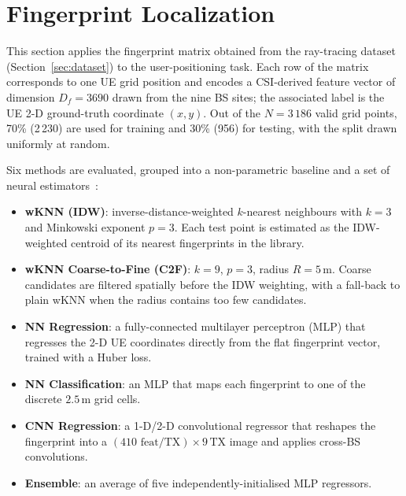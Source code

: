 \section{Fingerprint Localization}
\label{sec:localization}

This section applies the fingerprint matrix obtained from the ray-tracing
dataset (Section~\ref{sec:dataset}) to the user-positioning task.
Each row of the matrix corresponds to one UE grid position and encodes a
CSI-derived feature vector of dimension $D_f = 3690$ drawn from the nine
BS sites; the associated label is the UE 2-D ground-truth coordinate
$(x,y)$.
Out of the $N=3\,186$ valid grid points, 70\% (2\,230) are used for
training and 30\% (956) for testing, with the split drawn uniformly at
random.

Six methods are evaluated, grouped into a non-parametric baseline and a
set of neural estimators~\cite{hoydis2023sionna_rt,3gpp_nr_channel}:
\begin{itemize}
  \item \textbf{wKNN (IDW)}: inverse-distance-weighted $k$-nearest
        neighbours with $k=3$ and Minkowski exponent $p=3$.  Each test
        point is estimated as the IDW-weighted centroid of its nearest
        fingerprints in the library.
  \item \textbf{wKNN Coarse-to-Fine (C2F)}: $k=9$, $p=3$, radius
        $R=5\,\text{m}$.  Coarse candidates are filtered spatially
        before the IDW weighting, with a fall-back to plain wKNN when
        the radius contains too few candidates.
  \item \textbf{NN Regression}: a fully-connected multilayer perceptron
        (MLP) that regresses the 2-D UE coordinates directly from the
        flat fingerprint vector, trained with a Huber loss.
  \item \textbf{NN Classification}: an MLP that maps each fingerprint to
        one of the discrete $2.5\,\text{m}$ grid cells.
  \item \textbf{CNN Regression}: a 1-D/2-D convolutional regressor that
        reshapes the fingerprint into a $(410 \text{ feat}/\text{TX})
        \times 9\,\text{TX}$ image and applies cross-BS
        convolutions.
  \item \textbf{Ensemble}: an average of five independently-initialised
        MLP regressors.
\end{itemize}

